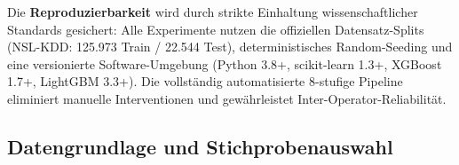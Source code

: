 \documentclass[11pt,a4paper]{article}
\begin{document}
    Die \textbf{Reproduzierbarkeit} wird durch strikte Einhaltung wissenschaftlicher Standards gesichert: Alle Experimente nutzen die offiziellen Datensatz-Splits (NSL-KDD: 125.973 Train / 22.544 Test), deterministisches Random-Seeding und eine versionierte Software-Umgebung (Python 3.8+, scikit-learn 1.3+, XGBoost 1.7+, LightGBM 3.3+). Die vollständig automatisierte 8-stufige Pipeline eliminiert manuelle Interventionen und gewährleistet Inter-Operator-Reliabilität.

    \subsection{Datengrundlage und Stichprobenauswahl}
\end{document}
